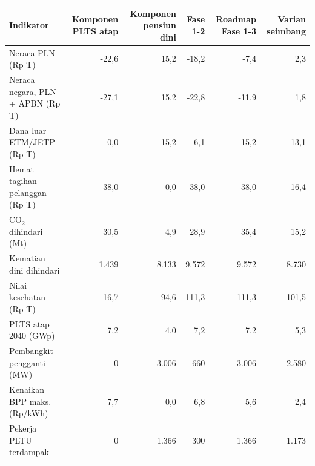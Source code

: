 \begin{tabular}{lrrrrr}
\toprule
Indikator & Komponen PLTS atap & Komponen pensiun dini & Fase 1-2 & Roadmap Fase 1-3 & Varian seimbang \\
\midrule
Neraca PLN (Rp T) & -22,6 & 15,2 & -18,2 & -7,4 & 2,3 \\
Neraca negara, PLN + APBN (Rp T) & -27,1 & 15,2 & -22,8 & -11,9 & 1,8 \\
Dana luar ETM/JETP (Rp T) & 0,0 & 15,2 & 6,1 & 15,2 & 13,1 \\
Hemat tagihan pelanggan (Rp T) & 38,0 & 0,0 & 38,0 & 38,0 & 16,4 \\
CO$_2$ dihindari (Mt) & 30,5 & 4,9 & 28,9 & 35,4 & 15,2 \\
Kematian dini dihindari & 1.439 & 8.133 & 9.572 & 9.572 & 8.730 \\
Nilai kesehatan (Rp T) & 16,7 & 94,6 & 111,3 & 111,3 & 101,5 \\
PLTS atap 2040 (GWp) & 7,2 & 4,0 & 7,2 & 7,2 & 5,3 \\
Pembangkit pengganti (MW) & 0 & 3.006 & 660 & 3.006 & 2.580 \\
Kenaikan BPP maks. (Rp/kWh) & 7,7 & 0,0 & 6,8 & 5,6 & 2,4 \\
Pekerja PLTU terdampak & 0 & 1.366 & 300 & 1.366 & 1.173 \\
\bottomrule
\end{tabular}
